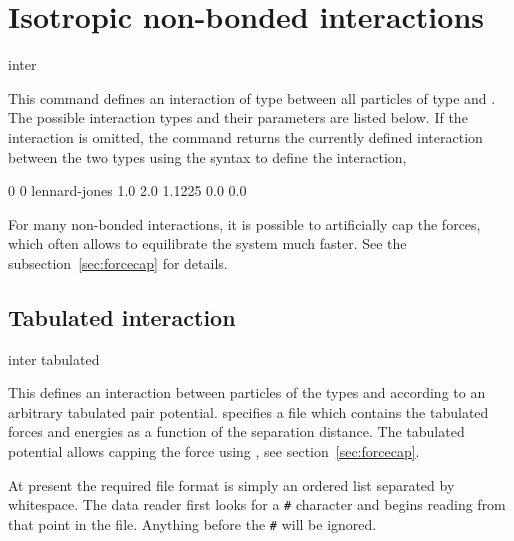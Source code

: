 \section{Isotropic non-bonded interactions}
\label{sec:inter-nb}

\begin{essyntax*}
  inter  
\end{essyntax*}
This command defines an interaction of type  between
all particles of type  and . The possible
interaction types and their parameters are listed below. If the
interaction is omitted, the command returns the currently defined
interaction between the two types using the syntax to define the
interaction, \eg
\begin{tclcode}
  0 0 lennard-jones 1.0 2.0 1.1225 0.0 0.0
\end{tclcode}

For many non-bonded interactions, it is possible to artificially cap
the forces, which often allows to equilibrate the system much
faster. See the subsection~\ref{sec:forcecap} for details.


\subsection{Tabulated interaction}
\label{sec:tabnonbonded}

\begin{essyntax}
  inter   tabulated %
  \begin{features}
  \end{features}
\end{essyntax}

This defines an interaction between particles of the types  and
 according to an arbitrary tabulated pair potential. 
specifies a file which contains the tabulated forces and energies as a function
of the separation distance. The tabulated potential allows capping the force
using , see section~\ref{sec:forcecap}.

At present the required file format is simply an ordered list separated by
whitespace. The data reader first looks for a {\tt \#} character and begins
reading from that point in the file. Anything before the {\tt \#} will be
ignored.


